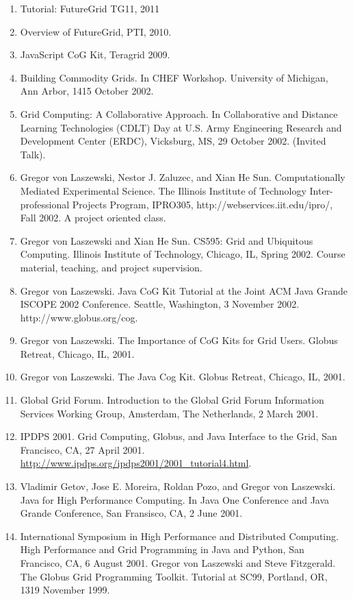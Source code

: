 \documentclass{article}
\begin{document}
\begin{enumerate}
\item  Tutorial: FutureGrid TG11, 2011
\item  Overview of FutureGrid, PTI, 2010.
\item  JavaScript CoG Kit, Teragrid 2009. 
\item  Building Commodity Grids. In CHEF Workshop. University of Michigan, Ann Arbor, 1415 October 2002. 
\item  Grid Computing: A Collaborative Approach. In Collaborative and Distance Learning Technologies (CDLT) Day at U.S. Army Engineering Research and Development Center (ERDC), Vicksburg, MS, 29 October 2002. (Invited Talk). 
\item  Gregor von Laszewski, Nestor J. Zaluzec, and Xian He Sun. Computationally Mediated Experimental Science. The Illinois Institute of Technology Inter-professional Projects Program, IPRO305, http://webservices.iit.edu/ipro/, Fall 2002. A project oriented class. 
\item  Gregor von Laszewski and Xian He Sun. CS595: Grid and Ubiquitous Computing. Illinois Institute of Technology, Chicago, IL, Spring 2002. Course material, teaching, and project supervision. 
\item  Gregor von Laszewski. Java CoG Kit Tutorial at the Joint ACM Java Grande ISCOPE 2002 Conference. Seattle, Washington, 3 November 2002. http://www.globus.org/cog. 
\item  Gregor von Laszewski. The Importance of CoG Kits for Grid Users. Globus Retreat, Chicago, IL, 2001. 
\item  Gregor von Laszewski. The Java Cog Kit. Globus Retreat, Chicago, IL, 2001. 
\item  Global Grid Forum. Introduction to the Global Grid Forum Information Services Working Group, Amsterdam, The Netherlands, 2 March 2001. 
\item  IPDPS 2001. Grid Computing, Globus, and Java Interface to the Grid, San Francisco, CA, 27 April 2001. \url{http://www.ipdps.org/ipdps2001/2001_tutorial4.html}.
\item  Vladimir Getov, Jose E. Moreira, Roldan Pozo, and Gregor von Laszewski. Java for High Performance Computing. In Java One Conference and Java Grande Conference, San Fransisco, CA, 2 June 2001. 
\item  International Symposium in High Performance and Distributed Computing. High Performance and Grid Programming in Java and Python, San Francisco, CA, 6 August 2001. Gregor von Laszewski and Steve Fitzgerald. The Globus Grid Programming Toolkit. Tutorial at SC99, Portland, OR, 1319 November 1999. 

\end{enumerate}
\end{document}
